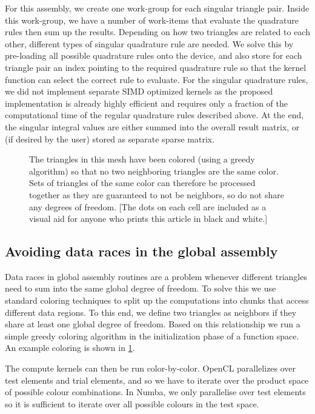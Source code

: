For this assembly, we create one work-group for each singular triangle pair. Inside this work-group, we have a number of work-items that evaluate the quadrature rules then sum up the results. Depending on how two triangles are related to each other, different types of singular quadrature rule are needed. We solve this by pre-loading all possible quadrature rules onto the device, and also store for each triangle pair an index pointing to the required quadrature rule so that the kernel function can select the correct rule to evaluate. For the singular quadrature rules, we did not implement separate SIMD optimized kernels as the proposed implementation is already highly efficient and requires only a fraction of the computational time of the regular quadrature rules described above. At the end, the singular integral values are either summed into the overall result matrix, or (if desired by the user) stored as separate sparse matrix.

\begin{figure}
	\center
	
	\caption{The triangles in this mesh have been colored (using a greedy algorithm) so that no two neighboring triangles are the same color. Sets of triangles of the same color can therefore be processed together as they are guaranteed to not be neighbors, so do not share any degrees of freedom. [The dots on each cell are included as a visual aid for anyone who prints this article in black and white.]}
	\label{fig:colouring}
\end{figure}

\subsection{Avoiding data races in the global assembly}
Data races in global assembly routines are a problem whenever different triangles need to sum into the same global degree of freedom. To solve this we use standard coloring techniques to split up the computations into chunks that access different data regions. To this end, we define two triangles as neighbors if they share at least one global degree of freedom. Based on this relationship we run a simple greedy coloring algorithm in the initialization phase of a function space. An example coloring is shown in \cref{fig:colouring}.

The compute kernels can then be run color-by-color. OpenCL parallelizes over test elements and trial elements, and so we have to iterate over the product space of possible colour combinations. In Numba, we only parallelise over test elements so it is sufficient to iterate over all possible colours in the test space.

